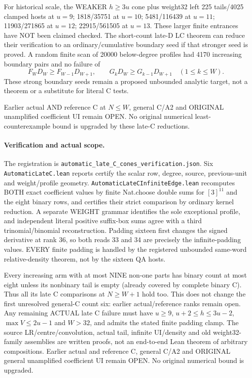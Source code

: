 For historical scale, the WEAKER $h\ge3u$ cone plus weight32 left 225 tails/4025 clamped hosts
at $u=9$; 1818/35751 at $u=10$; 5481/116439 at $u=11$;
11903/271865 at $u=12$; 22915/561505 at $u=13$.
These larger finite entrances have NOT been claimed checked.
The short-count late-D LC theorem can reduce their verification
to an ordinary/cumulative boundary seed if that stronger seed is
proved. A random finite scan of 20000 below-degree profiles had
4170 increasing boundary pairs and no failure of
\[
 F_W D_W\ge F_{W-1}D_{W+1},\qquad
 G_kD_W\ge G_{k-1}D_{W+1}\quad(1\le k\le W).
\]
These strong boundary seeds remain a proposed unbounded analytic
target, not a theorem or a substitute for literal C tests.

Earlier actual AND reference C at $N\le W$, general C/A2 and ORIGINAL
unamplified coefficient UI remain OPEN. No original numerical
least-counterexample bound is upgraded by these late-C reductions.

\paragraph{Verification and actual scope.}
The registration is \texttt{automatic\_late\_C\_cones\_verification.json}.
Six \texttt{AutomaticLateC.lean} reports certify the scalar row,
degree, source, previous-unit and weight/profile geometry.
\texttt{AutomaticLateCInfiniteEdge.lean} recomputes BOTH exact
coefficient values by finite Nat.choose double sums for $[3]^{11}$
and the eight binary rows, and certifies their strict comparison
by ordinary kernel reduction. A separate WEIGHT grammar identifies
the sole exceptional profile, and independent literal positive
suffix-box sums agree with a third trinomial/binomial reconstruction.
Padding sixteen first changes the signed derivative at rank 36,
so both reads 33 and 34 are precisely the infinite-padding values.
EVERY finite padding is handled by the registered unbounded same-word
relative-density theorem, not by the sixteen QA hosts.

Every increasing arm with at most NINE non-one parts has binary
count at most eight unless its nonbinary tail is empty (already
covered by complete binary C). Thus all its late C comparisons
at $N\ge W+1$ hold too. This does not change the first unresolved
general-C count six: earlier actual/reference ranks remain open.
Any remaining ACTUAL late C failure must have $u\ge9$,
$u+2\le h\le3u-2$, $\max V\le2u-1$ and $W>32$,
and admits the stated finite padding clamp.
The source LR/centre/convolution, actual tail, infinite UI/density
and old weight32-family assemblies are written proofs, not an
end-to-end Lean theorem of arbitrary compositions. Earlier actual
and reference C, general C/A2 and ORIGINAL general unamplified
coefficient UI remain OPEN. No original numerical bound is upgraded.
